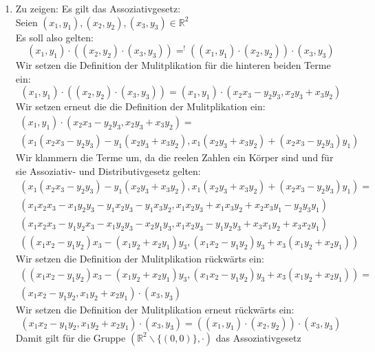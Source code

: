 \documentclass{article}
\begin{document}
    \begin{enumerate}[ label = (\alph*) ]

        \item Zu zeigen: Es gilt das Assoziativgesetz: \\
        Seien \( (x_1, y_1), (x_2, y_2), (x_3, y_3) \in \mathbb{R}^2 \) \\
        Es soll also gelten:
        \[ (x_1, y_1) \cdot ((x_2, y_2) \cdot (x_3, y_3)) =^! ((x_1, y_1) \cdot  (x_2, y_2)) \cdot (x_3, y_3) \]
        Wir setzen die Definition der Mulitplikation für die hinteren beiden Terme ein:
        \[ (x_1, y_1) \cdot ((x_2, y_2) \cdot (x_3, y_3)) = (x_1, y_1) \cdot (x_2 x_3 - y_2 y_3, x_2 y_3 + x_3 y_2) \]
        Wir setzen erneut die die Definition der Mulitplikation ein:
        \begin{gather*}
            (x_1, y_1) \cdot (x_2 x_3 - y_2 y_3, x_2 y_3 + x_3 y_2) = \\
            ( x_1 (x_2 x_3 - y_2 y_3) - y_1 (x_2 y_3 + x_3 y_2) , x_1 (x_2 y_3 + x_3 y_2) + (x_2 x_3 - y_2 y_3) y_1 )
        \end{gather*}    
        Wir klammern die Terme um, da die reelen Zahlen ein Körper sind und für sie Assoziativ- und Distributivgesetz gelten:
        \begin{gather*}
            ( x_1 (x_2 x_3 - y_2 y_3) - y_1 (x_2 y_3 + x_3 y_2) , x_1 (x_2 y_3 + x_3 y_2) + (x_2 x_3 - y_2 y_3) y_1 ) = \\
            ( x_1 x_2 x_3 - x_1 y_2 y_3 - y_1 x_2 y_3 - y_1 x_3 y_2, x_1 x_2 y_3 + x_1 x_3 y_2 + x_2 x_3 y_1 - y_2 y_3 y_1) \\
            ( x_1 x_2 x_3 - y_1 y_2 x_3 - x_1 y_2 y_3 - x_2 y_1 y_3, x_1 x_2 y_3 - y_1 y_2 y_3 + x_3 x_1 y_2 + x_3 x_2 y_1) \\
            ( (x_1 x_2 - y_1 y_2) x_3 - (x_1 y_2 + x_2 y_1) y_3, (x_1 x_2 - y_1 y_2) y_3 + x_3 (x_1 y_2 + x_2 y_1) )
        \end{gather*}
        Wir setzen die Definition der Mulitplikation rückwärts ein:
        \begin{gather*}
            ( (x_1 x_2 - y_1 y_2) x_3 - (x_1 y_2 + x_2 y_1) y_3, (x_1 x_2 - y_1 y_2) y_3 + x_3 (x_1 y_2 + x_2 y_1) ) = \\
            (x_1 x_2 - y_1 y_2, x_1 y_2 + x_2 y_1) \cdot (x_3, y_3)
        \end{gather*}
        Wir setzen die Definition der Mulitplikation erneut rückwärts ein:
        \[ (x_1 x_2 - y_1 y_2, x_1 y_2 + x_2 y_1) \cdot (x_3, y_3) = ((x_1, y_1) \cdot (x_2, y_2)) \cdot (x_3, y_3) \]
        Damit gilt für die Gruppe \( (\mathbb{R}^2 \backslash \{(0, 0)\}, \cdot) \) das Assoziativgesetz


\end{enumerate}
\end{document}

